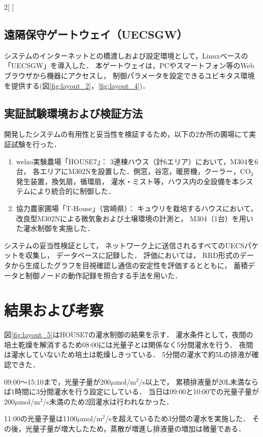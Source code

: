 \documentclass[dvipdfmx]{jsaishoshiki}
\begin{document}
\begin{multicols}{2}[\textwidth=115pt \columnsep=30pt]
\subsection{遠隔保守ゲートウェイ（UECSGW）}

システムのインターネットとの橋渡しおよび設定環境として，Linuxベースの「UECSGW」を導入した．
本ゲートウェイは，PCやスマートフォン等のWebブラウザから機器にアクセスし，%
制御パラメータを設定できるユビキタス環境を提供する(図\ref{fig:layout_2}，\ref{fig:layout_4})．

\subsection{実証試験環境および検証方法}
開発したシステムの有用性と妥当性を検証するため，以下の2か所の圃場にて実証試験を行った．
\begin{enumerate}
\item welzo実験農場「HOUSE7」： 3連棟ハウス（計6エリア）において，M304を6台，%
  各エリアにM302Nを設置した．側窓，谷窓，暖房機，クーラー，CO$_2$発生装置，換気扇，循環扇，%
  灌水・ミスト等，ハウス内の全設備を本システムにより統合的に制御した．
\item 協力農家圃場「T-House」（宮崎県）： キュウリを栽培するハウスにおいて，%
  改良型M302Nによる微気象および土壌環境の計測と，%
  M304（1台）を用いた灌水制御を実施した．
\end{enumerate}

システムの妥当性検証として，
ネットワーク上に送信されるすべてのUECSパケットを収集し，%
データベースに記録した．%
評価においては，%
RRD形式のデータから生成したグラフを目視確認し通信の安定性を評価するとともに，%
蓄積データと制御ノードの動作記録を照合する手法を用いた．

\section{結果および考察}
図\ref{fig:layout_5}はHOUSE7の灌水制御の結果を示す．%
灌水条件として，夜間の培土乾燥を解消するため08:00には光量子とは関係なく5分間灌水を行う．
夜間は灌水していないため培土は乾燥しきっている．
5分間の灌水で約5Lの排液が確認できた．

09:00〜15:10まで，光量子量が200$\mu$mol/m$^2$/s以上で，
累積排液量が20L未満ならば1時間に3分間灌水を行う設定にしている．
当日は09:00と10:00での光量子量が200$\mu$mol/m$^2$/s未満のため2回灌水は行われなかった．

11:00の光量子量は1100$\mu$mol/m$^2$/sを超えているため3分間の灌水を実施した．
その後，光量子量が増大したため，蒸散が増進し排液量の増加は微量である．


\end{multicols}
\end{document}
